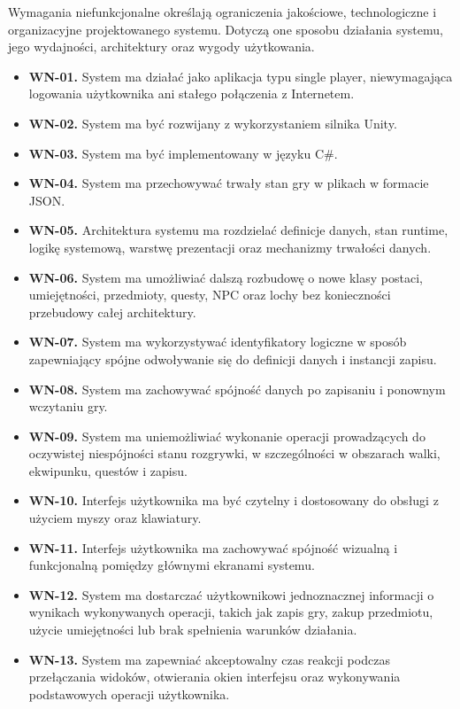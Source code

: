 Wymagania niefunkcjonalne określają ograniczenia jakościowe, technologiczne i organizacyjne projektowanego systemu. Dotyczą one sposobu działania systemu, jego wydajności, architektury oraz wygody użytkowania.

\begin{itemize}
    \item \textbf{WN-01.} System ma działać jako aplikacja typu single player, niewymagająca logowania użytkownika ani stałego połączenia z Internetem.
    \item \textbf{WN-02.} System ma być rozwijany z wykorzystaniem silnika Unity.
    \item \textbf{WN-03.} System ma być implementowany w języku C\#.
    \item \textbf{WN-04.} System ma przechowywać trwały stan gry w plikach w formacie JSON.
    \item \textbf{WN-05.} Architektura systemu ma rozdzielać definicje danych, stan runtime, logikę systemową, warstwę prezentacji oraz mechanizmy trwałości danych.
    \item \textbf{WN-06.} System ma umożliwiać dalszą rozbudowę o nowe klasy postaci, umiejętności, przedmioty, questy, NPC oraz lochy bez konieczności przebudowy całej architektury.
    \item \textbf{WN-07.} System ma wykorzystywać identyfikatory logiczne w sposób zapewniający spójne odwoływanie się do definicji danych i instancji zapisu.
    \item \textbf{WN-08.} System ma zachowywać spójność danych po zapisaniu i ponownym wczytaniu gry.
    \item \textbf{WN-09.} System ma uniemożliwiać wykonanie operacji prowadzących do oczywistej niespójności stanu rozgrywki, w szczególności w obszarach walki, ekwipunku, questów i zapisu.
    \item \textbf{WN-10.} Interfejs użytkownika ma być czytelny i dostosowany do obsługi z użyciem myszy oraz klawiatury.
    \item \textbf{WN-11.} Interfejs użytkownika ma zachowywać spójność wizualną i funkcjonalną pomiędzy głównymi ekranami systemu.
    \item \textbf{WN-12.} System ma dostarczać użytkownikowi jednoznacznej informacji o wynikach wykonywanych operacji, takich jak zapis gry, zakup przedmiotu, użycie umiejętności lub brak spełnienia warunków działania.
    \item \textbf{WN-13.} System ma zapewniać akceptowalny czas reakcji podczas przełączania widoków, otwierania okien interfejsu oraz wykonywania podstawowych operacji użytkownika.

\end{itemize}
